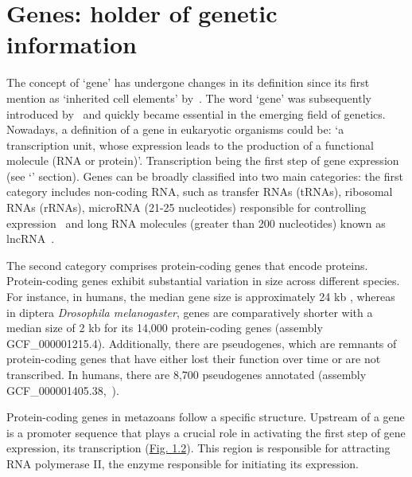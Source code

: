 \section{Genes: holder of genetic information}
\label{sec:genes}

The concept of `gene' has undergone changes in its definition since its first mention as `inherited cell elements' by~\citet{mendel_versuche_1866}. The word `gene' was subsequently introduced by~\citet{johannsen_elemente_1909} and quickly became essential in the emerging field of genetics. Nowadays, a definition of a gene in eukaryotic organisms could be: `a transcription unit, whose expression leads to the production of a functional molecule (\acrshort{RNA} or protein)'. Transcription being the first step of gene expression (see `' section). Genes can be broadly classified into two main categories: the first category includes non-coding \acrshort{RNA}, such as transfer \acrshort{RNA}s (\acrshort{tRNA}s), ribosomal RNAs (rRNAs), microRNA (21-25 nucleotides) responsible for controlling expression~\citep{filipowicz_mechanisms_2008, obrien_overview_2018} and long \acrshort{RNA} molecules (greater than 200 nucleotides) known as \acrshort{lncRNA}~\citep{kashi_discovery_2016}.

The second category comprises protein-coding genes that encode proteins. Protein-coding genes exhibit substantial variation in size across different species. For instance, in humans, the median gene size is approximately 24 \acrshort{kb} \citep{fuchs_4sudrb-seq_2014}, whereas in diptera \textit{Drosophila melanogaster}, genes are comparatively shorter with a median size of 2 \acrshort{kb} for its 14,000 protein-coding genes (assembly GCF\_000001215.4). Additionally, there are pseudogenes, which are remnants of protein-coding genes that have either lost their function over time or are not transcribed. In humans, there are 8,700 pseudogenes annotated (assembly GCF\_000001405.38,~\citet{mighell_vertebrate_2000}).

Protein-coding genes in metazoans follow a specific structure. Upstream of a gene is a promoter sequence that plays a crucial role in activating the first step of gene expression, its transcription (\hyperref[fig:genestructure]{Fig. 1.2}). This region is responsible for attracting \acrshort{RNA} polymerase II, the enzyme responsible for initiating its expression.

